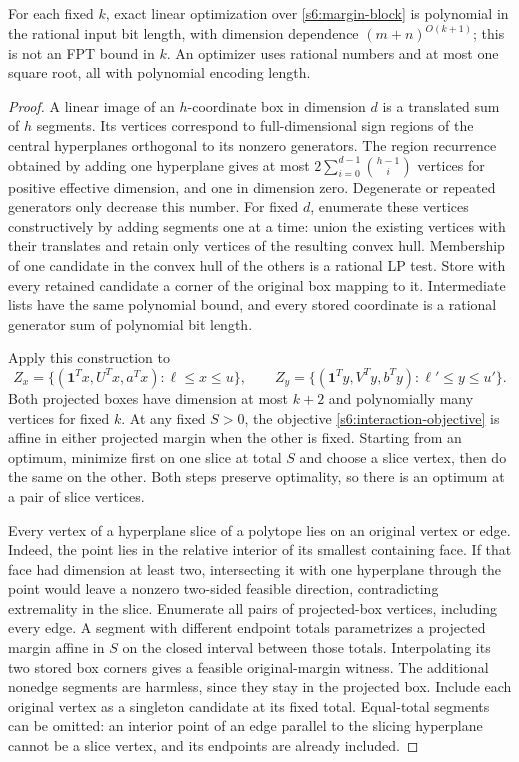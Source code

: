 \begin{theorem}\label{s6:rank-theorem}
For each fixed $k$, exact linear optimization over \eqref{s6:margin-block}
is polynomial in the rational input bit length, with dimension dependence
$(m+n)^{O(k+1)}$; this is not an FPT bound in $k$. An optimizer uses
rational numbers and at most one square root, all with polynomial encoding length.
\end{theorem}
\begin{proof}
A linear image of an $h$-coordinate box in dimension $d$ is a translated
sum of $h$ segments. Its vertices correspond to full-dimensional sign
regions of the central hyperplanes orthogonal to its nonzero generators.
The region recurrence obtained by adding one hyperplane gives at most
$2\sum_{i=0}^{d-1}\binom{h-1}{i}$ vertices for positive effective
dimension, and one in dimension zero. Degenerate or repeated generators
only decrease this number. For fixed $d$, enumerate these vertices
constructively by adding segments one at a time: union the existing
vertices with their translates and retain only vertices of the resulting
convex hull. Membership of one candidate in the convex hull of the others
is a rational LP test. Store with every retained candidate a corner of
the original box mapping to it. Intermediate lists have the same
polynomial bound, and every stored coordinate is a rational generator
sum of polynomial bit length.

Apply this construction to
\[
 Z_x=\{(\mathbf1^Tx,U^Tx,a^Tx):\ell\le x\le u\},\qquad
 Z_y=\{(\mathbf1^Ty,V^Ty,b^Ty):\ell'\le y\le u'\}.
\]
Both projected boxes have dimension at most $k+2$ and polynomially many
vertices for fixed $k$. At any fixed $S>0$, the objective
\eqref{s6:interaction-objective} is affine in either projected margin
when the other is fixed. Starting from an optimum, minimize first on
one slice at total $S$ and choose a slice vertex, then do the same on
the other. Both steps preserve optimality, so there is an optimum
at a pair of slice vertices.

Every vertex of a hyperplane slice of a polytope lies on an original
vertex or edge. Indeed, the point lies in the relative interior of its
smallest containing face. If that face had dimension
at least two, intersecting it with one hyperplane through the point
would leave a nonzero two-sided feasible direction, contradicting
extremality in the slice.
Enumerate all pairs of projected-box vertices, including every edge.
A segment with different endpoint totals parametrizes a projected margin
affine in $S$ on the closed interval between those totals. Interpolating
its two stored box corners gives a feasible original-margin witness.
The additional nonedge segments are harmless, since they stay in the
projected box. Include each original vertex as a singleton candidate
at its fixed total. Equal-total segments can be omitted: an interior
point of an edge parallel to the slicing hyperplane cannot be a slice
vertex, and its endpoints are already included.


\end{proof}
